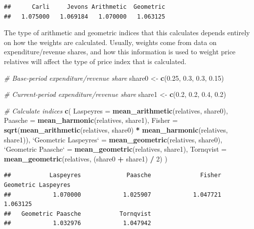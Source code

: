 \documentclass[]{article}
\newenvironment{Shaded}{\begin{snugshade}}{\end{snugshade}}
\newcommand{\CommentTok}[1]{\textcolor[rgb]{0.56,0.35,0.01}{\textit{#1}}}
\newcommand{\DataTypeTok}[1]{\textcolor[rgb]{0.13,0.29,0.53}{#1}}
\newcommand{\DecValTok}[1]{\textcolor[rgb]{0.00,0.00,0.81}{#1}}
\newcommand{\FloatTok}[1]{\textcolor[rgb]{0.00,0.00,0.81}{#1}}
\newcommand{\KeywordTok}[1]{\textcolor[rgb]{0.13,0.29,0.53}{\textbf{#1}}}
\newcommand{\NormalTok}[1]{#1}
\newcommand{\OperatorTok}[1]{\textcolor[rgb]{0.81,0.36,0.00}{\textbf{#1}}}
\newcommand{\StringTok}[1]{\textcolor[rgb]{0.31,0.60,0.02}{#1}}
\begin{document}
\begin{verbatim}
##      Carli     Jevons Arithmetic  Geometric 
##   1.075000   1.069184   1.070000   1.063125
\end{verbatim}

The type of arithmetic and geometric indices that this calculates depends entirely on how the weights are calculated. Usually, weights come from data on expenditure/revenue shares, and how this information is used to weight price relatives will affect the type of price index that is calculated.

\begin{Shaded}
\begin{Highlighting}[]
\CommentTok{# Base-period expenditure/revenue share}
\NormalTok{share0 <-}\StringTok{ }\KeywordTok{c}\NormalTok{(}\FloatTok{0.25}\NormalTok{, }\FloatTok{0.3}\NormalTok{, }\FloatTok{0.3}\NormalTok{, }\FloatTok{0.15}\NormalTok{) }

\CommentTok{# Current-period expenditure/revenue share}
\NormalTok{share1 <-}\StringTok{ }\KeywordTok{c}\NormalTok{(}\FloatTok{0.2}\NormalTok{, }\FloatTok{0.2}\NormalTok{, }\FloatTok{0.4}\NormalTok{, }\FloatTok{0.2}\NormalTok{)}

\CommentTok{# Calculate indices}
\KeywordTok{c}\NormalTok{(}
  \DataTypeTok{Laspeyres =} \KeywordTok{mean_arithmetic}\NormalTok{(relatives, share0),}
  \DataTypeTok{Paasche =} \KeywordTok{mean_harmonic}\NormalTok{(relatives, share1),}
  \DataTypeTok{Fisher =} \KeywordTok{sqrt}\NormalTok{(}\KeywordTok{mean_arithmetic}\NormalTok{(relatives, share0) }\OperatorTok{*}\StringTok{ }\KeywordTok{mean_harmonic}\NormalTok{(relatives, share1)),}
  \StringTok{`}\DataTypeTok{Geometric Laspeyres}\StringTok{`}\NormalTok{ =}\StringTok{ }\KeywordTok{mean_geometric}\NormalTok{(relatives, share0),}
  \StringTok{`}\DataTypeTok{Geometric Paasche}\StringTok{`}\NormalTok{ =}\StringTok{ }\KeywordTok{mean_geometric}\NormalTok{(relatives, share1),}
  \DataTypeTok{Tornqvist =} \KeywordTok{mean_geometric}\NormalTok{(relatives, (share0 }\OperatorTok{+}\StringTok{ }\NormalTok{share1) }\OperatorTok{/}\StringTok{ }\DecValTok{2}\NormalTok{)}
\NormalTok{)}
\end{Highlighting}
\end{Shaded}

\begin{verbatim}
##           Laspeyres             Paasche              Fisher Geometric Laspeyres 
##            1.070000            1.025907            1.047721            1.063125 
##   Geometric Paasche           Tornqvist 
##            1.032976            1.047942
\end{verbatim}
\end{document}
